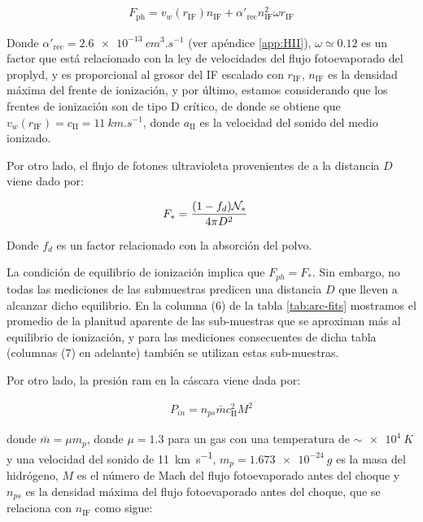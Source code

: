 \begin{align}
  F_{\mathrm{ph}} = v_w(r_{\mathrm{IF}}) n_{\mathrm{IF}} + \alpha'_{\mathrm{rec}}n^2_{\mathrm{IF}} \omega r_{\mathrm{IF}}\label{eq:F-ph}
\end{align}

Donde $\alpha'_{\mathrm{rec}} = \SI{2.6e-13}{cm^3.s^{-1}}$ (ver apéndice \ref{app:HII}), $\omega \simeq 0.12$ es un factor que está relacionado con la ley de velocidades del flujo fotoevaporado del proplyd, y es proporcional al grosor del IF escalado con $r_{\mathrm{IF}}$, $n_{\mathrm{IF}}$ es la densidad máxima del frente de ionización, y por último, estamos considerando que los frentes de ionización son de tipo D crítico, de donde se obtiene que $v_w(r_{\mathrm{IF}}) = c_{\mathrm{II}} = \SI{11}{km.s^{-1}}$, donde $a_{\mathrm{II}}$ es la velocidad del sonido del medio ionizado.

Por otro lado, el flujo de fotones ultravioleta provenientes de \thC{} a la distancia $D$ viene dado por:

\begin{align}
   F_* &= \frac{(1-f_d)\mathcal{N}_*}{4\pi D^2} \label{eq:F-star} 
\end{align}

Donde $f_d$ es un factor relacionado con la absorción del polvo.

La condición de equilibrio de ionización implica que $F_{ph} = F_*$. Sin embargo, no todas las mediciones de las submuestras predicen una distancia $D$ que lleven a alcanzar dicho equilibrio. En la columna (6) de la tabla \ref{tab:arc-fits} mostramos el promedio de la planitud aparente de las sub-muestras que se aproximan más al equilibrio de ionización, y para las mediciones consecuentes de dicha tabla (columnas (7) en adelante) también se utilizan estas sub-muestras.

Por otro lado, la presión ram en la cáscara viene dada por:

\begin{align}
  P_{in} = n_{ps}\bar{m}c_{\mathrm{II}}^2M^2 \label{eq:P-in}
\end{align}

donde $\bar{m} = \mu m_p$, donde $\mu = 1.3$ para un gas con una temperatura de $\sim \SI{e4}{K}$ y una velocidad del sonido de \SI{11}{km.s^{-1}}, $m_p = \SI{1.673e-24}{g}$ es la masa del hidrógeno, $M$ es el número de Mach del flujo fotoevaporado antes del choque y $n_{ps}$ es la densidad máxima del flujo fotoevaporado antes del choque, que se relaciona con $n_{\mathrm{IF}}$ como sigue:


